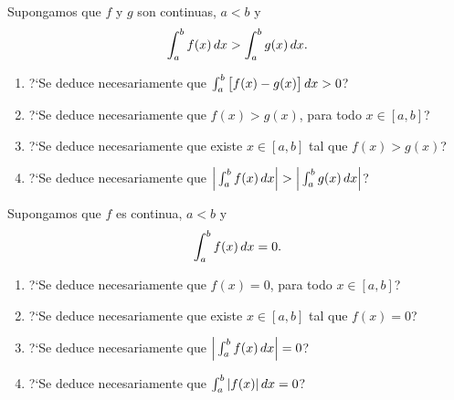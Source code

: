 \item Supongamos que $f$ y $g$ son continuas, $a<b$ y 
\[
\int_a^b f(x)\,dx > \int_a^b g(x)\,dx.
\]
\begin{enumerate}
  \item ?`Se deduce necesariamente que $\int_a^b \big[ f(x)-g(x)\big]\,dx > 0$?
  \item ?`Se deduce necesariamente que $f(x)>g(x)$, para todo $x\in [a,b]$?
  \item ?`Se deduce necesariamente que existe $x\in[a,b]$ tal que $f(x)>g(x)$?
  \item ?`Se deduce necesariamente que $\Big|\int_a^b f(x)\,dx\Big| > \Big|\int_a^b g(x)\,dx\Big| $?
\end{enumerate}

\item Supongamos que $f$ es continua, $a<b$ y 
\[
\int_a^b f(x)\,dx =0.
\]
\begin{enumerate}
  \item ?`Se deduce necesariamente que $f(x)=0$, para todo $x\in [a,b]$?
  \item ?`Se deduce necesariamente que existe $x\in[a,b]$ tal que $f(x)=0$?
  \item ?`Se deduce necesariamente que $\Big|\int_a^b f(x)\,dx\Big| =0 $?
  \item ?`Se deduce necesariamente que $\int_a^b |f(x)|\,dx =0 $?
\end{enumerate}